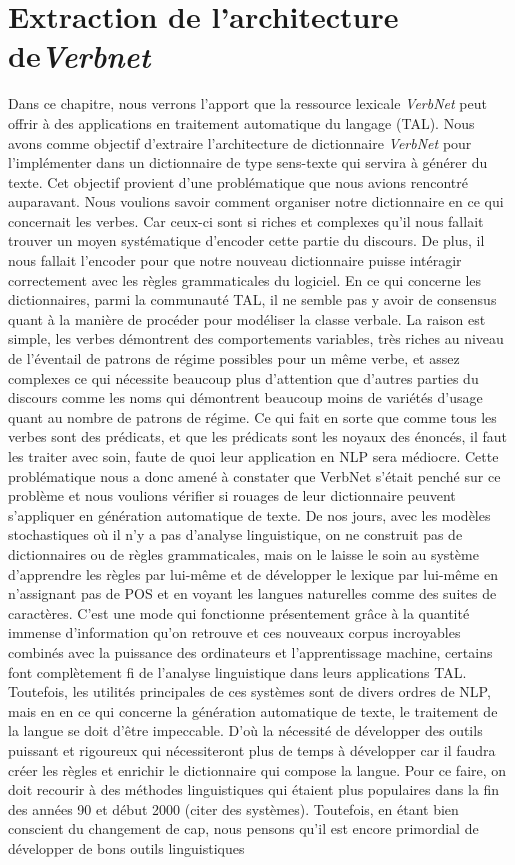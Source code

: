 \chapter{Extraction de l'architecture de\emph{Verbnet}}

Dans ce chapitre, nous verrons l'apport que la ressource lexicale \emph{VerbNet} peut offrir à des applications en traitement automatique du langage (TAL). Nous avons comme objectif d'extraire l'architecture de dictionnaire \emph{VerbNet} pour l'implémenter dans un dictionnaire de type sens-texte qui servira à générer du texte. Cet objectif provient d'une problématique que nous avions rencontré auparavant. Nous voulions savoir comment organiser notre dictionnaire en ce qui concernait les verbes. Car ceux-ci sont si riches et complexes qu'il nous fallait trouver un moyen systématique d'encoder cette partie du discours. De plus, il nous fallait l'encoder pour que notre nouveau dictionnaire puisse intéragir correctement avec les règles grammaticales du logiciel. En ce qui concerne les dictionnaires, parmi la communauté TAL,  il ne semble pas y avoir de consensus quant à la manière de procéder pour modéliser la classe verbale. La raison est simple,  les verbes démontrent des comportements variables, très riches au niveau de l'éventail de patrons de régime possibles pour un même verbe, et assez complexes ce qui nécessite beaucoup plus d'attention que d'autres parties du discours comme les noms qui démontrent beaucoup moins de variétés d'usage quant au nombre de patrons de régime. Ce qui fait en sorte que comme tous les verbes sont des prédicats, et que les prédicats sont les noyaux des énoncés, il faut les traiter avec soin, faute de quoi leur application en NLP sera médiocre. Cette problématique nous a donc amené à constater que VerbNet s'était penché sur ce problème et nous voulions vérifier si rouages de leur dictionnaire peuvent s'appliquer en génération automatique de texte. De nos jours, avec les modèles stochastiques où il n'y a pas d'analyse linguistique, on ne construit pas de dictionnaires ou de règles grammaticales, mais on le laisse le soin au système d'apprendre les règles par lui-même et de développer le lexique par lui-même en n'assignant pas de POS et en voyant les langues naturelles comme des suites de caractères. C'est une mode qui fonctionne présentement grâce à la quantité immense d'information qu'on retrouve et ces nouveaux corpus incroyables combinés avec la puissance des ordinateurs et l'apprentissage machine, certains font complètement fi de l'analyse linguistique dans leurs applications TAL. Toutefois, les utilités principales de ces systèmes sont de divers ordres de NLP, mais en en ce qui concerne la génération automatique de texte, le traitement de la langue se doit d'être impeccable. D'où la nécessité de développer des outils puissant et rigoureux qui nécessiteront plus de temps à développer car il faudra créer les règles et enrichir le dictionnaire qui compose la langue. Pour ce faire, on doit recourir à des méthodes linguistiques qui étaient plus populaires dans la fin des années 90 et début 2000 (citer des systèmes). Toutefois, en étant bien conscient du changement de cap, nous pensons qu'il est encore primordial de développer de bons outils linguistiques 